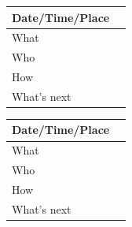 \documentclass{article}
\begin{document}
\begin{table}[H]
\begin{tabular}{|p{1.5in}|p{4in}|}
\hline
Date/Time/Place &  \\ \hline
What            &  \\ \hline
Who             &  \\ \hline
How             &  \\ \hline
What's next     &  \\ \hline
\end{tabular}
\end{table}

\begin{table}[H]
\begin{tabular}{|p{1.5in}|p{4in}|}
\hline
Date/Time/Place &  \\ \hline
What            &  \\ \hline
Who             &  \\ \hline
How             &  \\ \hline
What's next     &  \\ \hline
\end{tabular}
\end{table}
\end{document}
